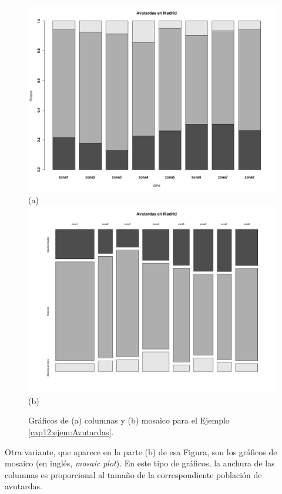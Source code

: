 \begin{Ejemplo}
\begin{figure}[p]
\begin{center}
\begin{bn}
\includegraphics[width=12cm]{../fig/Cap12-Avutardas-Grafico01-bn.png}\\
(a)\\
\includegraphics[width=12cm]{../fig/Cap12-Avutardas-Grafico02-bn.png}\\
(b)\\
\end{bn}
\caption{Gráficos de (a) columnas y (b) mosaico para el Ejemplo \ref{cap12:ejem:Avutardas}.}
\label{cap11:Fig:ColumnasMosaicoAvutardas}
\end{center}
\end{figure}
Otra variante, que aparece en la parte (b) de esa Figura, son los gráficos de mosaico (en inglés, {\em mosaic plot}). En este tipo de gráficos, la anchura de las columnas es proporcional al tamaño de la correspondiente población de avutardas.



\end{Ejemplo}
